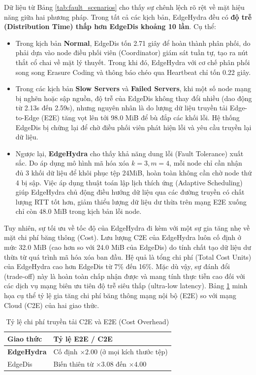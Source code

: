 \documentclass[11pt,a4paper]{article}
\begin{document}
Dữ liệu từ Bảng \ref{tab:fault_scenarios} cho thấy sự chênh lệch rõ rệt về mặt hiệu năng giữa hai phương pháp. Trong tất cả các kịch bản, EdgeHydra đều có \textbf{độ trễ (Distribution Time) thấp hơn EdgeDis khoảng 10 lần}. Cụ thể:

\begin{itemize}
    \item Trong kịch bản \textbf{Normal}, EdgeDis tốn 2.71 giây để hoàn thành phân phối, do phải dựa vào node điều phối viên (Coordinator) giám sát tuần tự, tạo ra nút thắt cổ chai về mặt lý thuyết. Trong khi đó, EdgeHydra với cơ chế phân phối song song Erasure Coding và thông báo chéo qua Heartbeat chỉ tốn 0.22 giây.
    \item Trong các kịch bản \textbf{Slow Servers} và \textbf{Failed Servers}, khi một số node mạng bị nghẽn hoặc sập nguồn, độ trễ của EdgeDis không thay đổi nhiều (dao động từ 2.13s đến 2.59s), nhưng nguyên nhân là do lượng dữ liệu truyền tải Edge-to-Edge (E2E) tăng vọt lên tới 98.0 MiB để bù đắp các khối lỗi. Hệ thống EdgeDis bị chững lại để chờ điều phối viên phát hiện lỗi và yêu cầu truyền lại dữ liệu.
    \item Ngược lại, \textbf{EdgeHydra} cho thấy khả năng dung lỗi (Fault Tolerance) xuất sắc. Do áp dụng mô hình mã hóa xóa $k=3, m=4$, mỗi node chỉ cần nhận đủ 3 khối dữ liệu để khôi phục tệp 24MiB, hoàn toàn không cần chờ node thứ 4 bị sập. Việc áp dụng thuật toán lập lịch thích ứng (Adaptive Scheduling) giúp EdgeHydra chủ động điều hướng dữ liệu qua các đường truyền có chất lượng RTT tốt hơn, giảm thiểu lượng dữ liệu dư thừa trên mạng E2E xuống chỉ còn 48.0 MiB trong kịch bản lỗi node.
\end{itemize}

Tuy nhiên, sự tối ưu về tốc độ của EdgeHydra đi kèm với một sự gia tăng nhẹ về mặt chi phí băng thông (Cost). Lưu lượng C2E của EdgeHydra luôn cố định ở mức 32.0 MiB (cao hơn so với 24.0 MiB của EdgeDis) do tính chất tạo dữ liệu dư thừa từ quá trình mã hóa xóa ban đầu. Hệ quả là tổng chi phí (Total Cost Units) của EdgeHydra cao hơn EdgeDis từ 7\% đến 16\%. Mặc dù vậy, sự đánh đổi (trade-off) này là hoàn toàn chấp nhận được và mang tính thực tiễn cao đối với các dịch vụ mạng biên ưu tiên độ trễ siêu thấp (ultra-low latency). Bảng \ref{tab:e2e_c2e_overhead} minh họa cụ thể tỷ lệ gia tăng chi phí băng thông mạng nội bộ (E2E) so với mạng Cloud (C2E) của hai giao thức.

\begin{table}[H]
\centering
\caption{Tỷ lệ chi phí truyền tải C2E và E2E (Cost Overhead)}
\label{tab:e2e_c2e_overhead}
\small
\begin{tabularx}{0.8\textwidth}{>{\raggedright\arraybackslash}X>{\raggedright\arraybackslash}X}
\toprule
\textbf{Giao thức} & \textbf{Tỷ lệ E2E / C2E} \\
\midrule
\textbf{EdgeHydra} & Cố định $\times 2.00$ (ở mọi kích thước tệp) \\
EdgeDis & Biến thiên từ $\times 3.08$ đến $\times 4.00$ \\
\bottomrule
\end{tabularx}
\end{table}
\end{document}
